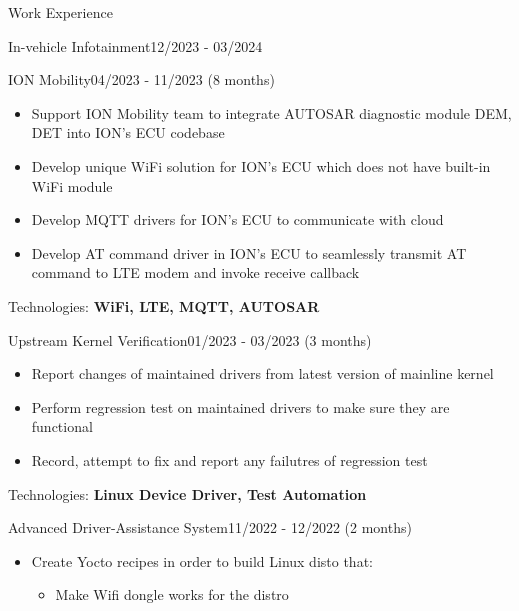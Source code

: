 \documentclass{resume} %
\begin{document}
\begin{rSection}{Work Experience}
\begin{rCompanySubsection}
\begin{rProjectSubsubsection}{In-vehicle Infotainment}{12/2023 - 03/2024}
        \end{rProjectSubsubsection}
        \begin{rProjectSubsubsection}{ION Mobility}{04/2023 - 11/2023 (8 months)}
            \begin{itemize}
                \item Support ION Mobility team to integrate AUTOSAR diagnostic module DEM, DET into ION's ECU codebase
                \item Develop unique WiFi solution for ION's ECU which does not have built-in WiFi module
                \item Develop MQTT drivers for ION's ECU to communicate with cloud
                \item Develop AT command driver in ION's ECU to seamlessly transmit AT command to LTE modem and invoke receive callback
            \end{itemize}
            \hspace*{2.5em}Technologies: \textbf{WiFi, LTE, MQTT, AUTOSAR}
        \end{rProjectSubsubsection}
        \begin{rProjectSubsubsection}{Upstream Kernel Verification}{01/2023 - 03/2023 (3 months)}
            \begin{itemize}
                \setlength{\itemindent}{1.25em}
                \item Report changes of maintained drivers from latest version of mainline kernel
                \item Perform regression test on maintained drivers to make sure they are functional
                \item Record, attempt to fix and report any failutres of regression test
            \end{itemize}
            \hspace*{2.5em}Technologies: \textbf{Linux Device Driver, Test Automation}
        \end{rProjectSubsubsection}
        \begin{rProjectSubsubsection}{Advanced Driver-Assistance System}{11/2022 - 12/2022 (2 months)}
            \begin{itemize}
                \setlength{\itemindent}{1.25em}
                \item Create Yocto recipes in order to build Linux disto that:
                \begin{itemize}
                    \item Make Wifi dongle works for the distro

\end{itemize}
\end{itemize}
\end{rProjectSubsubsection}
\end{rCompanySubsection}
\end{rSection}
\end{document}
